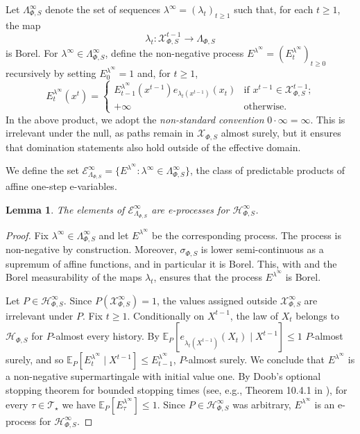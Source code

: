\documentclass[10pt, a4paper]{article}
\newcommand{\E}{\mathbb E}
\newcommand{\e}{e}
\newcommand{\Ee}{\mathcal E}
\newcommand{\EeP}{\Ee_{\LP}}
\newcommand{\Hh}{\mathcal H}
\newcommand{\HhP}{\Hh_{\Phi,S}}
\newcommand{\LP}{\Lambda_{\Phi,S}}
\newcommand{\sP}{\sigma_{\Phi,S}}
\newcommand{\T}{\mathcal T}
\newcommand{\X}{\mathcal X}
\newcommand{\XP}{\X_{\Phi,S}}
\newtheorem{lemma}{Lemma}
\begin{document}
Let $\LP^\infty$ denote the set of sequences $\lambda^\infty=(\lambda_t)_{t\geq1}$ such that, for each $t\geq1$, the map
$$\lambda_t:\XP^{t-1}\to\LP$$
is Borel. For $\lambda^\infty\in\LP^\infty$, define the non-negative process $E^{\lambda^\infty}=(E_t^{\lambda^\infty})_{t\geq0}$ recursively by setting $E_0^{\lambda^\infty}=1$ and, for $t\geq1$,
$$E_t^{\lambda^\infty}(x^t)=\begin{cases}E_{t-1}^{\lambda^\infty}(x^{t-1})\e_{\lambda_t(x^{t-1})}(x_t) & \text{if $x^{t-1}\in\XP^{t-1}$;}\\+\infty & \text{otherwise.}\end{cases}$$
In the above product, we adopt the \emph{non-standard convention} $0\cdot\infty=\infty$. This  is irrelevant under the null, as paths remain in $\XP$ almost surely, but it ensures that domination statements also hold outside of the effective domain.

We define the set  $\EeP^\infty=\{E^{\lambda^\infty}:\lambda^\infty\in\LP^\infty\}$, the class of predictable products of affine one-step e-variables. 

\begin{lemma}\label{lemma:EePinfeproc}
    The elements of $\EeP^\infty$ are e-processes for $\HhP^\infty$.
\end{lemma}
\begin{proof}
    Fix $\lambda^\infty\in\LP^\infty$ and let $E^{\lambda^\infty}$ be the corresponding process. The process is non-negative by construction. Moreover, $\sP$ is lower semi-continuous as a supremum of affine functions, and in particular it is Borel. This, with   and the Borel measurability of the maps $\lambda_t$, ensures that the process $E^{\lambda^\infty}$ is Borel.

    Let $P\in\HhP^\infty$. Since $P(\XP^\infty)=1$, the values assigned outside $\XP^\infty$ are irrelevant under $P$. Fix $t\geq1$. Conditionally on $X^{t-1}$, the law of $X_t$ belongs to $\HhP$ for $P$-almost every history. By  $\E_P\left[\e_{\lambda_t(X^{t-1})}(X_t)\mid X^{t-1}\right]\leq1$ $P$-almost surely, and so $\E_P[E_t^{\lambda^\infty}\mid X^{t-1}]\leq E_{t-1}^{\lambda^\infty}$, $P$-almost surely. We conclude that $E^{\lambda^\infty}$ is a non-negative supermartingale with initial value one. By Doob's optional stopping theorem for bounded stopping times (see, e.g., Theorem 10.4.1 in \citealt{dudley2002real}), for every $\tau\in\T_\star$ we have $\E_P[E_\tau^{\lambda^\infty}]\leq1$. Since $P\in\HhP^\infty$ was arbitrary, $E^{\lambda^\infty}$ is an e-process for $\HhP^\infty$.
\end{proof}
\end{document}
